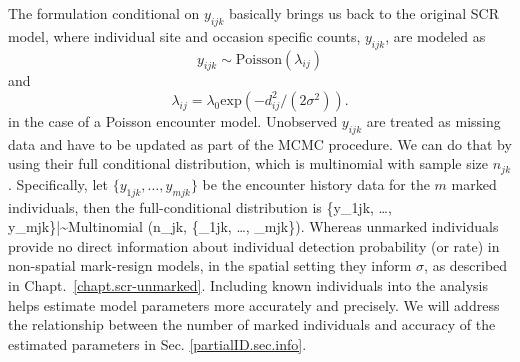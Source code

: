 The formulation conditional on $y_{ijk}$ basically brings us back to
the original SCR model, where individual site and occasion specific
counts, $y_{ijk}$, are modeled as
\[
y_{ijk} \sim \mbox{Poisson}(\lambda _{ij})
\]
and
\[
\lambda _{ij} = \lambda_0  \mbox{exp}(-d_{ij}^2/(2 \sigma^2)).
\]
in the case of a Poisson encounter model.
Unobserved $y_{ijk}$ are treated as missing data and have to be
updated as part of the MCMC procedure. We can do that by using their
full conditional distribution, which is multinomial with sample size
$n_{jk}$.
Specifically, let $\{y_{1jk}, \ldots, y_{mjk}\}$ be the encounter history data for
the $m$ marked individuals, then the full-conditional distribution is
\{y_{1jk}, \ldots, y_{mjk}\}|\cdot \sim \mbox{Multinomial} (n_{jk}, \{\lambda_{1jk}, \ldots, \lambda_{mjk}\}).
\]
Whereas unmarked individuals %
provide no direct information about individual detection probability (or
rate) in non-spatial mark-resign models, in the spatial setting they
inform $\sigma$, as described in
Chapt.~\ref{chapt.scr-unmarked}. Including known individuals into the
analysis helps estimate
model parameters more accurately and precisely. We will address the
relationship between the number of marked individuals and accuracy of
the estimated parameters in Sec. \ref{partialID.sec.info}.


